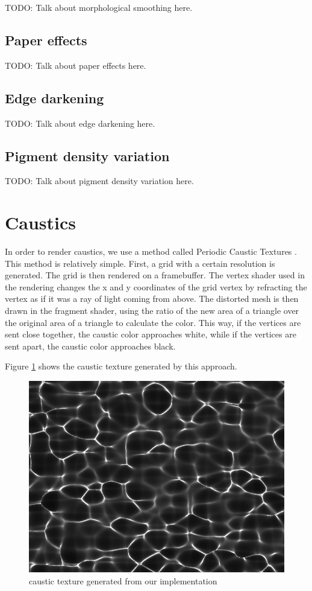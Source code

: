 \documentclass{article}
\begin{document}
TODO: Talk about morphological smoothing here.

\subsection{Paper effects}

TODO: Talk about paper effects here.

\subsection{Edge darkening}

TODO: Talk about edge darkening here.

\subsection{Pigment density variation}

TODO: Talk about pigment density variation here.

\newpage
\section{Caustics}

In order to render caustics, we use a method called Periodic Caustic Textures \cite{periodic_caustic_textures}. This method is relatively simple. First, a grid with a certain resolution is generated. The grid is then rendered on a framebuffer. The vertex shader used in the rendering changes the x and y coordinates of the grid vertex by refracting the vertex as if it was a ray of light coming from above. The distorted mesh is then drawn in the fragment shader, using the ratio of the new area of a triangle over the original area of a triangle to calculate the color. This way, if the vertices are sent close together, the caustic color approaches white, while if the vertices are sent apart, the caustic color approaches black.

Figure \ref{fig:caustics_texture} shows the caustic texture generated by this approach.

\begin{figure}[h]
 \includegraphics[width=\columnwidth]{imgs/caustics_texture.png}
 \caption{caustic texture generated from our implementation}
 \label{fig:caustics_texture}
\end{figure}
\end{document}
